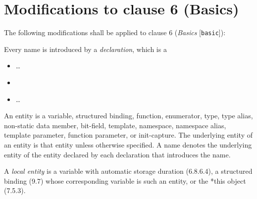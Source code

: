 \section{Modifications to clause 6 (Basics)}

The following modifications shall be applied to clause 6 (\emph{Basics}
[\texttt{basic}]):

\begin{modification}
Every name is introduced by a \emph{declaration}, which is a

\begin{itemize}[label=\textemdash]
\item \ldots

\item
{}

\item \ldots
\end{itemize}

\end{modification}

\begin{modification}
An entity is a variable, structured binding,  function, 
enumerator, type, type alias, non-static
data member, bit-field, template, namespace, namespace alias, template parameter, function parameter, or
init-capture. The underlying entity of an entity is that entity unless otherwise specified. A name denotes the
underlying entity of the entity declared by each declaration that introduces the name.
\end{modification}

\begin{modification}
A \emph{local entity} is a variable with automatic storage duration (6.8.6.4), a structured binding (9.7) whose
corresponding variable is such an entity,  or the *this object (7.5.3).
\end{modification}

